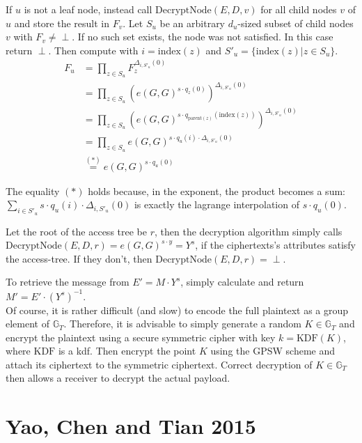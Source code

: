 If $u$ is not a leaf node, instead call $\text{DecryptNode}(E, D, v)$ for all child nodes $v$ of $u$ and store the result in $F_v$.
Let $S_u$ be an arbitrary $d_u$-sized subset of child nodes $v$ with $F_v \neq \perp$. If no such set exists, the node was not satisfied. In this case return $\perp$.
Then compute with $i = \text{index}(z)$ and $S'_u = \{\text{index}(z) | z \in S_u\}$.
\begin{equation}
    \begin{split}
        F_u &= \prod_{z \in S_u} F_z^{\Delta_{i,S'_u}(0)}\\
        &= \prod_{z \in S_u} (e(G,G)^{s\cdot q_z(0)})^{\Delta_{i,S'_u}(0)}\\
        &= \prod_{z \in S_u} (e(G,G)^{s\cdot q_{\text{parent}(z)}(\text{index}(z))})^{\Delta_{i,S'_u}(0)}\\
        &= \prod_{z \in S_u} e(G,G)^{s\cdot q_u(i) \cdot \Delta_{i,S'_u}(0)}\\
        &\stackrel{(*)}{=} e(G,G)^{s \cdot q_u(0)}
    \end{split}
\end{equation}

The equality $(*)$ holds because, in the exponent, the product becomes a sum: $\sum_{i\in S'_u} s \cdot q_u(i) \cdot \Delta_{i,S'_u}(0)$ is exactly the lagrange interpolation of $s \cdot q_u(0)$.

Let the root of the access tree be $r$, then the decryption algorithm simply calls $\text{DecryptNode}(E, D, r) = e(G,G)^{s \cdot y} = Y^s$, if the ciphertexts's attributes satisfy the \gls{access-tree}.
If they don't, then $\text{DecryptNode}(E, D, r) = \perp$.

To retrieve the message from $E' = M \cdot Y^s$, simply calculate and return $M' = E' \cdot (Y^s)^{-1}$.\\

Of course, it is rather difficult (and slow) to encode the full plaintext as a group element of $\mathbb{G}_T$.
Therefore, it is advisable to simply generate a random $K \in \mathbb{G}_T$ and encrypt the plaintext using a secure symmetric cipher with key $k = \text{KDF}(K)$, where $\text{KDF}$ is a \gls{kdf}.
Then encrypt the point $K$ using the GPSW scheme and attach its ciphertext to the symmetric ciphertext.
Correct decryption of $K \in \mathbb{G}_T$ then allows a receiver to decrypt the actual payload.

\section{Yao, Chen and Tian 2015}

